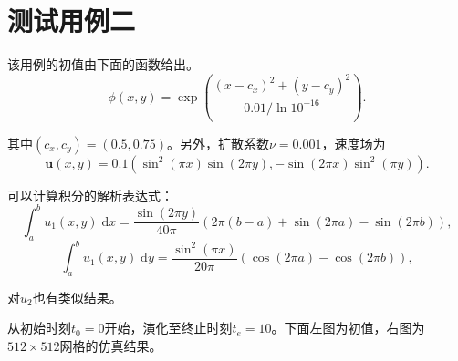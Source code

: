 \documentclass[lang=cn,10pt,bibend=bibtex]{elegantbook}
\begin{document}
\section{测试用例二}

该用例的初值由下面的函数给出。
\begin{equation*}
  \phi(x,y) = \exp\left(\frac{(x-c_x)^2+(y-c_y)^2}{0.01/\ln 10^{-16}}\right).
\end{equation*}

其中$(c_x,c_y)=(0.5,0.75)$。另外，扩散系数$\nu=0.001$，速度场为
\begin{equation*}
  \mathbf{u}(x,y) = 0.1(\sin^2(\pi x)\sin(2\pi y), -\sin(2\pi x)\sin^2(\pi y)).
\end{equation*}

可以计算积分的解析表达式：
\begin{equation*}
  \int_a^b u_1(x,y) \;\text{d}x= \frac{\sin(2\pi y)}{40\pi}(2\pi(b-a)+\sin(2\pi a)-\sin(2\pi b)),
\end{equation*}
\begin{equation*}
  \int_a^b u_1(x,y) \;\text{d}y= \frac{\sin^2(\pi x)}{20\pi}(\cos(2\pi a)-\cos(2\pi b)),
\end{equation*}

对$u_2$也有类似结果。

从初始时刻$t_0=0$开始，演化至终止时刻$t_e=10$。下面左图为初值，右图为$512\times 512$网格的仿真结果。
\end{document}
